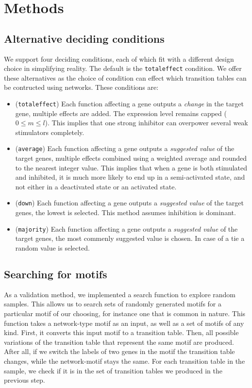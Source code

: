 \documentclass[../main.tex]{subfiles}
\begin{document}
\section{Methods}
\label{appendix_methods}

\subsection{Alternative deciding conditions}
\label{alternative_deciding}

We support four deciding conditions, each of which fit with a different design choice in simplifying reality.
The default is the \texttt{totaleffect} condition.
We offer these alternatives as the choice of condition can effect which transition tables can be contructed using networks.
These conditions are:
%
\begin{itemize}
\itemsep0em 
\item (\texttt{totaleffect}) Each function affecting a gene outputs a \textit{change} in the target gene, multiple effects are added. The expression level remains capped ($0 \le m \le l$). This implies that one strong inhibitor can overpower several weak stimulators completely.
\item (\texttt{average}) Each function affecting a gene outputs a \textit{suggested value} of the target genes, multiple effects combined using a weighted average and rounded to the nearest integer value. This implies that when a gene is both stimulated and inhibited, it is much more likely to end up in a semi-activated state, and not either in a deactivated state or an activated state.
\item (\texttt{down}) Each function affecting a gene outputs a \textit{suggested value} of the target genes, the lowest is selected. This method assumes inhibition is dominant.
\item (\texttt{majority}) Each function affecting a gene outputs a \textit{suggested value} of the target genes, the most commenly suggested value is chosen. In case of a tie a random value is selected.
\end{itemize}

\subsection{Searching for motifs}

As a validation method, we implemented a search function to explore random samples.
This allows us to search sets of randomly generated motifs for a particular motif of our choosing, for instance one that is common in nature.
This function takes a network-type motif as an input, as well as a set of motifs of any kind.
First, it converts this input motif to a transition table.
Then, all possible variations of the transition table that represent the same motif are produced.
After all, if we switch the labels of two genes in the motif the transition table changes, while the network-motif stays the same.
For each transition table in the sample, we check if it is in the set of transition tables we produced in the previous step.

\end{document}
